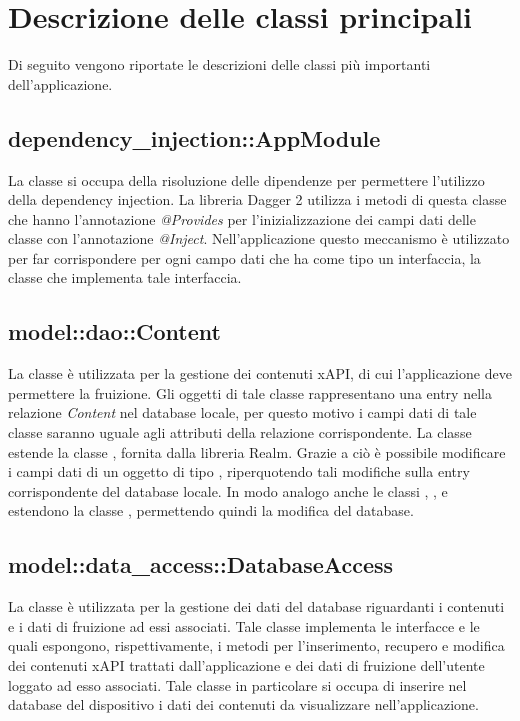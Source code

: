\documentclass[../Tesi.tex]{subfiles}
\begin{document}
	\section{Descrizione delle classi principali}
	Di seguito vengono riportate le descrizioni delle classi più importanti dell'applicazione.

		\subsection{dependency\_injection::AppModule}
		La classe  si occupa della risoluzione delle dipendenze per permettere l'utilizzo della dependency injection. La libreria Dagger 2 utilizza i metodi di questa classe che hanno l'annotazione \textit{@Provides} per l'inizializzazione dei campi dati delle classe con l'annotazione \textit{@Inject}. Nell'applicazione questo meccanismo è utilizzato per far corrispondere per ogni campo dati che ha come tipo un interfaccia, la classe che implementa tale interfaccia.

		\subsection{model::dao::Content}
		La classe  è utilizzata per la gestione dei contenuti xAPI, di cui l'applicazione deve permettere la fruizione. Gli oggetti di tale classe rappresentano una entry nella relazione \textit{Content} nel database locale, per questo motivo i campi dati di tale classe saranno uguale agli attributi della relazione corrispondente. La classe  estende la classe , fornita dalla libreria Realm. Grazie a ciò è possibile modificare i campi dati di un oggetto di tipo , riperquotendo tali modifiche sulla entry corrispondente del database locale. In modo analogo anche le classi , ,  e  estendono la classe , permettendo quindi la modifica del database.

		\subsection{model::data\_access::DatabaseAccess}
		La classe  è utilizzata per la gestione dei dati del database riguardanti i contenuti e i dati di fruizione ad essi associati. Tale classe implementa le interfacce  e  le quali espongono, rispettivamente, i metodi per l'inserimento, recupero e modifica dei contenuti xAPI trattati dall'applicazione e dei dati di fruizione dell'utente loggato ad esso associati. Tale classe in particolare si occupa di inserire nel database del dispositivo i dati dei contenuti da visualizzare nell'applicazione.
\end{document}
